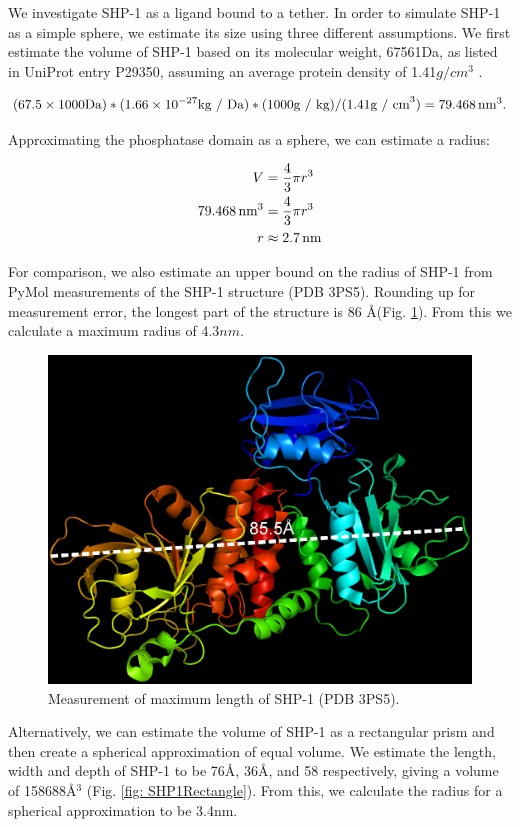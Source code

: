 \documentclass[../../AdvancementSummary.tex]{subfiles}
\begin{document}
We investigate SHP-1 as a ligand bound to a tether. In order to simulate SHP-1 as a simple sphere, we estimate its size using three different assumptions. We first estimate the volume of SHP-1 based on its molecular weight, 67561Da,  as listed in UniProt entry P29350, assuming an average protein density of 1.41$g/cm^3$ \cite{Fischer2004}.


\begin{equation*}
(67.5 \times 1000 \mbox{Da}) * (1.66\times10^{-27} \mbox{kg / Da}) * (1000 \mbox{g / kg}) / (1.41 \mbox{g / cm}^3) = 79.468 \,\mbox{nm}^3.
\end{equation*}

Approximating the phosphatase domain as a sphere, we can estimate a radius: 

\begin{align*}
V &= \frac{4}{3}\pi r^3 \\
79.468 \,\mbox{nm}^3 &= \frac{4}{3} \pi r^3 \\
r &\approx 2.7 \,\mbox{nm} \\
\end{align*}

For comparison, we also estimate an upper bound on the radius of SHP-1 from PyMol measurements of the SHP-1 structure (PDB 3PS5). Rounding up for measurement error, the longest part of the structure is 86 \AA (Fig. \ref{fig: SHP1Diag}). From this we calculate a maximum radius of 4.3$nm$.

\begin{figure}[H]
\begin{center}
\includegraphics[width=0.5\linewidth]{ResultsFigures/SHP1PyMol/Diagonal1.eps}
\end{center}
\caption{Measurement of maximum length of SHP-1 (PDB 3PS5). \label{fig: SHP1Diag}}
\end{figure}

Alternatively, we can estimate the volume of SHP-1 as a rectangular prism and then create a spherical approximation of equal volume. We estimate the length, width and depth of SHP-1 to be 76\AA, 36\AA, and 58\text{\AA} respectively, giving a volume of 158688\AA$^3$ (Fig. \ref{fig: SHP1Rectangle}). From this, we calculate the radius for a spherical approximation to be 3.4nm.
\end{document}
